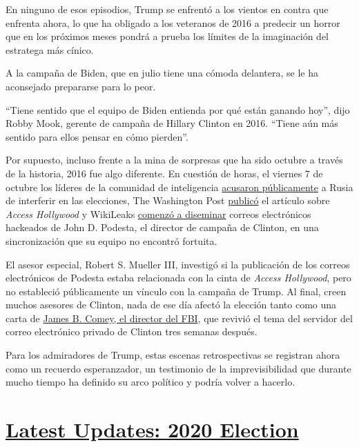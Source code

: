 En ninguno de esos episodios, Trump se enfrentó a los vientos en contra
que enfrenta ahora, lo que ha obligado a los veteranos de 2016 a
predecir un horror que en los próximos meses pondrá a prueba los límites
de la imaginación del estratega más cínico.

A la campaña de Biden, que en julio tiene una cómoda delantera, se le ha
aconsejado prepararse para lo peor.

``Tiene sentido que el equipo de Biden entienda por qué están ganando
hoy'', dijo Robby Mook, gerente de campaña de Hillary Clinton en 2016.
``Tiene aún más sentido para ellos pensar en cómo pierden''.

Por supuesto, incluso frente a la mina de sorpresas que ha sido octubre
a través de la historia, 2016 fue algo diferente. En cuestión de horas,
el viernes 7 de octubre los líderes de la comunidad de inteligencia
\href{https://www.dhs.gov/news/2016/10/07/joint-statement-department-homeland-security-and-office-director-national}{acusaron
públicamente} a Rusia de interferir en las elecciones, The Washington
Post
\href{https://www.washingtonpost.com/politics/trump-recorded-having-extremely-lewd-conversation-about-women-in-2005/2016/10/07/3b9ce776-8cb4-11e6-bf8a-3d26847eeed4_story.html}{publicó}
el artículo sobre \emph{Access Hollywood} y WikiLeaks
\href{https://www.nytimes.com/2016/10/12/us/politics/hillary-clinton-emails-wikileaks.html}{comenzó
a diseminar} correos electrónicos hackeados de John D. Podesta, el
director de campaña de Clinton, en una sincronización que su equipo no
encontró fortuita.

El asesor especial, Robert S. Mueller III, investigó si la publicación
de los correos electrónicos de Podesta estaba relacionada con la cinta
de \emph{Access Hollywood}, pero no estableció públicamente un vínculo
con la campaña de Trump. Al final, creen muchos asesores de Clinton,
nada de ese día afectó la elección tanto como una carta de
\href{https://www.nytimes.com/2019/10/12/us/politics/james-comey-trump.html}{James
B. Comey, el director del FBI}, que revivió el tema del servidor del
correo electrónico privado de Clinton tres semanas después.

Para los admiradores de Trump, estas escenas retrospectivas se registran
ahora como un recuerdo esperanzador, un testimonio de la
imprevisibilidad que durante mucho tiempo ha definido su arco político y
podría volver a hacerlo.

\hypertarget{latest-updates-2020-election}{%
\section{\texorpdfstring{\href{https://www.nytimes.com/2020/07/31/us/elections/biden-vs-trump.html?action=click\&pgtype=Article\&state=default\&region=MAIN_CONTENT_1\&context=storylines_live_updates}{Latest
Updates: 2020
Election}}{Latest Updates: 2020 Election}}\label{latest-updates-2020-election}}


